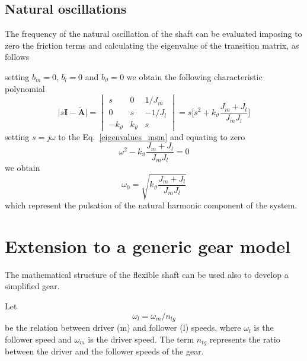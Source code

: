 \documentclass[11pt,a4paper]{article}
\numberwithin{equation}{section}
\theoremstyle{it}
\theoremstyle{definition}
\begin{document}
\subsection{Natural oscillations}
The frequency of the natural oscillation of the shaft can be evaluated imposing to zero the friction terms and calculating the eigenvalue of the transition matrix, as follows

\noindent setting $b_m=0$,  $b_l=0$ and $b_\vartheta=0$ we obtain the following characteristic polynomial
\begin{equation}\label{eigenvalues_msm}
	\Big|s\mathbf{I}-\tilde{\mathbf{A}}\Big|=\begin{vmatrix}
		s & 0 & 1/J_m \\[6pt]
		0 & s & -1/J_l \\[6pt]
		-k_\vartheta & k_\vartheta & s 
	\end{vmatrix} = s\Big[s^2+k_\vartheta\frac{J_m+J_l}{J_mJ_l}\Big]
\end{equation}
setting $s=j\omega$ to the Eq.~\eqref{eigenvalues_msm} and equating to zero
\begin{equation}
	\omega^2-k_\vartheta\frac{J_m+J_l}{J_mJ_l}=0
\end{equation}
we obtain
\begin{equation}
		\omega_0=\sqrt{k_\vartheta\frac{J_m+J_l}{J_mJ_l}}
\end{equation}
which represent the pulsation of the natural harmonic component of the system.

\section{Extension to a generic gear model}
The mathematical structure of the flexible shaft can be used also to develop a simplified gear.

Let
\begin{equation}
	\omega_l=\omega_m/n_{tg}
\end{equation}
be the relation between driver (m) and follower (l) speeds, where $\omega_l$ is the follower speed and $\omega_m$ is the driver speed. The term $n_{tg}$ represents the ratio between the driver and the follower speeds of the gear.
\end{document}
